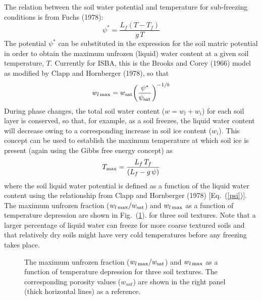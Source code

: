 The relation between the soil water potential and
temperature for sub-freezing conditions is
from Fuchs \etal (1978)\nocite{fuchs1978}:
%
%
\begin{equation}
\label{eq:soil_ice_potential}
\psi^\ast = \frac{L_f \left( T - T_f\right)}{g\,T} 
\end{equation}
%
The potential $\psi^\ast$ can be substituted
in the expression for the soil matric potential 
in order to obtain the maximum unfrozen (liquid) water content
at a given soil temperature, $T$.
Currently for ISBA, this is the Brooks and Corey (1966)\nocite{Brooks1966}
model as modified by Clapp and Hornberger (1978), so that
%
\begin{equation}
w_{l\,{\rm max}} = w_{\rm sat} 
{\left(\psi^\ast\over \psi_{\rm sat}\right)}^{-1/b} 
\end{equation}
%
%
During phase changes, the total soil water content
($w = w_l + w_i$) for each soil layer is conserved,
so that, for example, as a soil freezes, the liquid water
content will decrease owing to a corresponding increase
in soil ice content ($w_i$). This concept can be used 
to establish the maximum temperature at which soil
ice is present (again using the Gibbs free energy concept)
as
%
\begin{equation}
T_{\rm max} = {L_f\,T_f \over \left( L_f - g \,\psi\right)} 
\end{equation}
%
where the soil liquid water potential is defined 
as a function of the liquid water content using 
the relationship from Clapp and Hornberger (1978) [Eq.~(\ref{psi})].
The maximum unfrozen fraction
($w_{l\,{\rm max}}/w_{\rm sat}$) 
and $w_{l\,{\rm max}}$ as a function of temperature depression
are shown in Fig.~(\ref{wunfrz}).
for three soil textures. Note that a larger percentage of liquid water
can freeze for more coarse textured soils and that relatively dry
soils might have very cold temperatures before any freezing takes place.

\begin{figure}[h]
		 \begin{center}
		 \caption{The maximum unfrozen fraction
($w_{l\,{\rm max}}/w_{\rm sat}$) 
and $w_{l\,{\rm max}}$ as a function of temperature depression
for three soil textures. The corresponding porosity values ($w_{sat}$)
are shown in the right panel (thick horizontal lines) as a reference.}
		 \label{wunfrz}
		 \end{center}
\end{figure}

